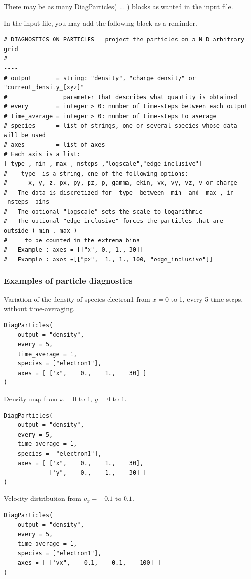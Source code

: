 \documentclass[11pt]{article}
\newcommand{\code}[1]{\colorbox{yellow!15}{\ttfamily #1}}
\begin{document}
There may be as many \code{DiagParticles( ... )} blocks as wanted in the input file.

In the input file, you may add the following block as a reminder.

\begin{lstlisting}
# DIAGNOSTICS ON PARTICLES - project the particles on a N-D arbitrary grid
# ------------------------------------------------------------------------
# output       = string: "density", "charge_density" or "current_density_[xyz]"
#                parameter that describes what quantity is obtained 
# every        = integer > 0: number of time-steps between each output
# time_average = integer > 0: number of time-steps to average
# species      = list of strings, one or several species whose data will be used
# axes         = list of axes
# Each axis is a list: [_type_,_min_,_max_,_nsteps_,"logscale","edge_inclusive"]
#   _type_ is a string, one of the following options:
#      x, y, z, px, py, pz, p, gamma, ekin, vx, vy, vz, v or charge
#   The data is discretized for _type_ between _min_ and _max_, in _nsteps_ bins
#   The optional "logscale" sets the scale to logarithmic
#   The optional "edge_inclusive" forces the particles that are outside (_min_,_max_)
#     to be counted in the extrema bins
#   Example : axes = [["x", 0., 1., 30]]
#   Example : axes =[["px", -1., 1., 100, "edge_inclusive"]]
\end{lstlisting}

\subsubsection*{Examples of particle diagnostics}

Variation of the density of species \code{electron1} from $x=0$ to 1, every 5 time-steps, without time-averaging.
\begin{lstlisting}
DiagParticles(
	output = "density",
	every = 5,
	time_average = 1,
	species = ["electron1"],
	axes = [ ["x",    0.,    1.,    30] ]
)
\end{lstlisting}

Density map from $x=0$ to 1, $y=0$ to 1.
\begin{lstlisting}
DiagParticles(
	output = "density",
	every = 5,
	time_average = 1,
	species = ["electron1"],
	axes = [ ["x",    0.,    1.,    30],
	         ["y",    0.,    1.,    30] ]
)
\end{lstlisting}

Velocity distribution from $v_x = -0.1$ to $0.1$.
\begin{lstlisting}
DiagParticles(
	output = "density",
	every = 5,
	time_average = 1,
	species = ["electron1"],
	axes = [ ["vx",   -0.1,    0.1,    100] ]
)
\end{lstlisting}
\end{document}
